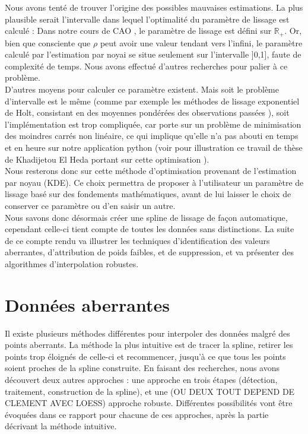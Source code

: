 \documentclass[a4paper,12pt]{article} %
\begin{document}
    
                Nous avons tenté de trouver l'origine des possibles mauvaises estimations. La plus plausible serait l'intervalle dans lequel l'optimalité du paramètre de lissage est calculé : Dans notre cours de CAO \cite{CAO_lissage}, le paramètre de lissage est défini sur $\mathds{R}_{+}$. Or, bien que consciente que $\rho$ peut avoir une valeur tendant vers l'infini, le paramètre calculé par l'estimation par noyai se situe seulement sur l'intervalle ]0,1], faute de complexité de temps. Nous avons effectué d'autres recherches pour palier à ce problème. \\
                D'autres moyens pour calculer ce paramètre existent. Mais soit le problème d'intervalle est le même (comme par exemple les méthodes de lissage exponentiel de Holt, consistant en des moyennes pondérées des observations passées \cite{Param_lissage}), soit l'implémentation est trop compliquée, car porte sur un problème de minimisation des moindres carrés non linéaire, ce qui implique qu'elle n'a pas abouti en temps et en heure sur notre application python (voir pour illustration ce travail de thèse de Khadijetou El Heda portant sur cette optimisation \cite{Exemple_these}). \\
            
                Nous resterons donc sur cette méthode d'optimisation provenant de l'estimation par noyau (KDE). 
                Ce choix permettra de proposer à l'utilisateur un paramètre de lissage basé sur des fondements mathématiques, avant de lui laisser le choix  de conserver ce paramètre ou d'en saisir un autre.\\
                
                 
                Nous savons donc désormais créer une spline de lissage de façon automatique, cependant celle-ci tient compte de toutes les données sans distinctions. La suite de ce compte rendu va illustrer les techniques d'identification des valeurs aberrantes, d'attribution de poids faibles, et de suppression, et va présenter des algorithmes d'interpolation robustes.


	\section{Données aberrantes}

        Il existe plusieurs méthodes différentes pour interpoler des données malgré des points aberrants. La méthode la plus intuitive est de tracer la spline, retirer les points trop éloignés de celle-ci et recommencer, jusqu'à ce que tous les points soient proches de la spline construite. En faisant des recherches, nous avons découvert deux autres approches : une approche en trois étapes (détection, traitement, construction de la spline), et une (OU DEUX TOUT DEPEND DE CLEMENT AVEC LOESS) approche robuste. Différentes possibilités vont être évoquées dans ce rapport pour chacune de ces approches, après la partie décrivant la méthode intuitive.
            
\end{document}

